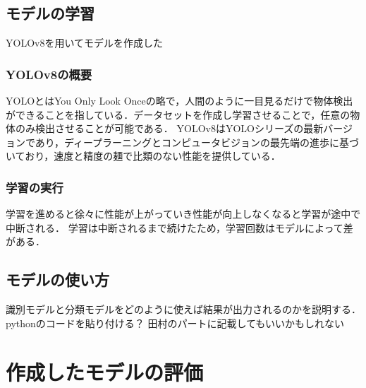 \begin{multicols*}{2}
\subsection{モデルの学習}
YOLOv8を用いてモデルを作成した
\subsubsection{YOLOv8の概要}
YOLOとはYou Only Look Onceの略で，人間のように一目見るだけで物体検出ができることを指している．データセットを作成し学習させることで，任意の物体のみ検出させることが可能である．
YOLOv8はYOLOシリーズの最新バージョンであり，ディープラーニングとコンピュータビジョンの最先端の進歩に基づいており，速度と精度の麺で比類のない性能を提供している．


\subsubsection{学習の実行}
学習を進めると徐々に性能が上がっていき性能が向上しなくなると学習が途中で中断される．
学習は中断されるまで続けたため，学習回数はモデルによって差がある．

\subsection{モデルの使い方}
識別モデルと分類モデルをどのように使えば結果が出力されるのかを説明する．pythonのコードを貼り付ける？
田村のパートに記載してもいいかもしれない
\section{作成したモデルの評価}


\end{multicols*}
